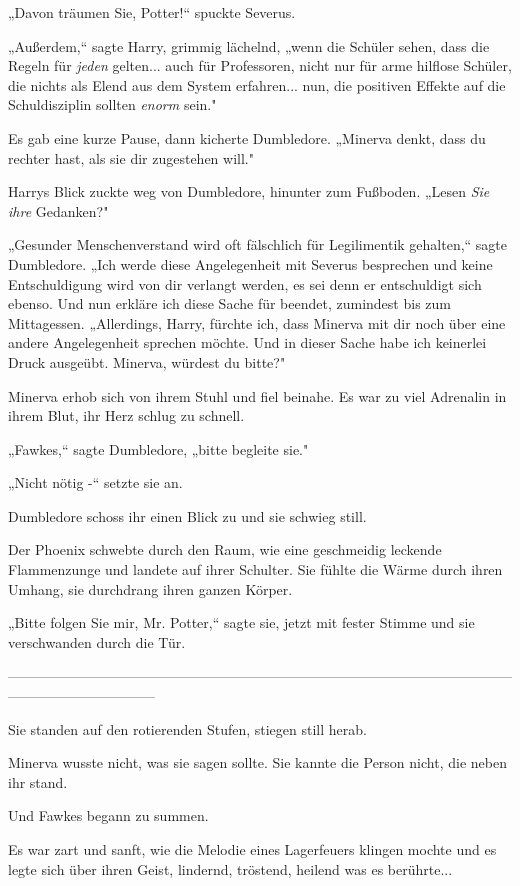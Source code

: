 {„Davon träumen Sie, Potter!“ spuckte Severus.

„Außerdem,“ sagte Harry, grimmig lächelnd, „wenn die Schüler sehen, dass die Regeln für \emph{jeden} gelten... auch für Professoren, nicht nur für arme hilflose Schüler, die nichts als Elend aus dem System erfahren... nun, die positiven Effekte auf die Schuldisziplin sollten \emph{enorm} sein."

Es gab eine kurze Pause, dann kicherte Dumbledore. „Minerva denkt, dass du rechter hast, als sie dir zugestehen will."

Harrys Blick zuckte weg von Dumbledore, hinunter zum Fußboden. „Lesen \emph{Sie ihre} Gedanken?"

„Gesunder Menschenverstand wird oft fälschlich für Legilimentik gehalten,“ sagte Dumbledore. „Ich werde diese Angelegenheit mit Severus besprechen und keine Entschuldigung wird von dir verlangt werden, es sei denn er entschuldigt sich ebenso. Und nun erkläre ich diese Sache für beendet, zumindest bis zum Mittagessen. „Allerdings, Harry, fürchte ich, dass Minerva mit dir noch über eine andere Angelegenheit sprechen möchte. Und in dieser Sache habe ich keinerlei Druck ausgeübt. Minerva, würdest du bitte?"

Minerva erhob sich von ihrem Stuhl und fiel beinahe. Es war zu viel Adrenalin in ihrem Blut, ihr Herz schlug zu schnell.

„Fawkes,“ sagte Dumbledore, „bitte begleite sie."

„Nicht nötig -“ setzte sie an.

Dumbledore schoss ihr einen Blick zu und sie schwieg still.

Der Phoenix schwebte durch den Raum, wie eine geschmeidig leckende Flammenzunge und landete auf ihrer Schulter. Sie fühlte die Wärme durch ihren Umhang, sie durchdrang ihren ganzen Körper.

„Bitte folgen Sie mir, Mr. Potter,“ sagte sie, jetzt mit fester Stimme und sie verschwanden durch die Tür.

--------------------------------------------------------------------------------------------------------------------------------------------

\hfill\break Sie standen auf den rotierenden Stufen, stiegen still herab.

Minerva wusste nicht, was sie sagen sollte. Sie kannte die Person nicht, die neben ihr stand.

Und Fawkes begann zu summen.

Es war zart und sanft, wie die Melodie eines Lagerfeuers klingen mochte und es legte sich über ihren Geist, lindernd, tröstend, heilend was es berührte...

}
